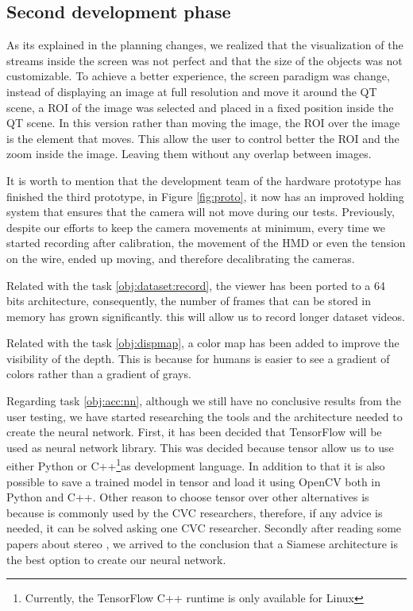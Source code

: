 \documentclass[10pt,a4paper,twocolumn,twoside]{article}
\begin{document}
	\subsection{Second development phase}
	
	As its explained in the planning changes, we realized that the visualization of the streams inside the screen was not perfect and that the size of the objects was not customizable. To achieve a better experience, the screen paradigm was change, instead of displaying an image at full resolution and move it around the QT scene, a ROI of the image was selected and placed in a fixed position inside the QT scene. In this version rather than moving the image, the ROI over the image is the element that moves. This allow the user to control better the ROI and the zoom inside the image. Leaving them without any overlap between images.  

	It is worth to mention that the development team of the hardware prototype has finished the third prototype, in Figure \ref{fig:proto}, it now has an improved holding system that ensures that the camera will not move during our tests. Previously, despite our efforts to keep the camera movements at minimum, every time we started recording after calibration, the movement of the HMD or even the tension on the wire, ended up moving, and therefore decalibrating the cameras.   
	
	Related with the task \ref{obj:dataset:record}, the viewer has been ported to a 64 bits architecture, consequently, the number of frames that can be stored in memory has grown significantly. this will allow us to record longer dataset videos.
	
	Related with the task \ref{obj:dispmap}, a color map has been added to improve the visibility of the depth. This is because for humans is easier to see a gradient of colors rather than a gradient of grays. 
	
	Regarding task \ref{obj:acc:nn}, although we still have no conclusive results from the user testing, we have started researching the tools and the architecture needed to create the neural network. 
	First, it has been decided that TensorFlow \cite{web:tensor} will be used as neural network library. This was decided because tensor allow us to use either Python or C++\footnote{Currently, the TensorFlow C++ runtime is only available for Linux}as development language. In addition to that it is also possible to save a trained model in tensor and load it using OpenCV both in Python and C++. Other reason to choose tensor over other alternatives is because is commonly used by the CVC researchers, therefore, if any advice is needed, it can be solved asking one CVC researcher. 
	Secondly after reading some papers about stereo \cite{redfelipeSintesisStereo},\cite{efficientStereoMatcher} we arrived to the conclusion that a Siamese architecture is the best option to create our neural network. %
	
\end{document}
